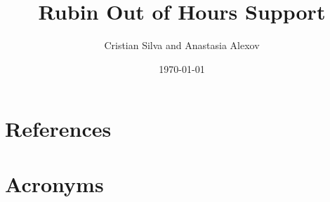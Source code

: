 \documentclass[OPS,lsstdraft,authoryear,toc]{lsstdoc}
\title{Rubin Out of Hours Support}
\author{%
Cristian Silva and Anastasia Alexov
}
\date{\today}
\begin{document}
\maketitle




\appendix
\section{References} \label{sec:bib}
\renewcommand{\refname}{} %


\section{Acronyms} \label{sec:acronyms}

\end{document}
